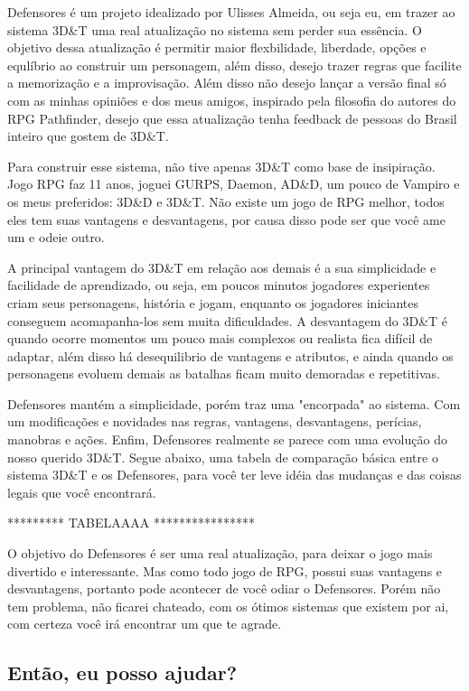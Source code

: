 Defensores é um projeto idealizado por Ulisses Almeida, ou seja eu, em trazer ao sistema 3D\&T uma real atualização no sistema sem perder sua essência. O objetivo dessa atualização é permitir maior flexbilidade, liberdade, opções e equlíbrio ao construir um personagem, além disso, desejo trazer regras que facilite a memorização e a improvisação. Além disso não desejo lançar a versão final só com as minhas opiniões e dos meus amigos, inspirado pela filosofia do autores do RPG Pathfinder, desejo que essa atualização tenha feedback de pessoas do Brasil inteiro que gostem de 3D\&T. 

Para construir esse sistema, não tive apenas 3D\&T como base de insipiração. Jogo RPG faz 11 anos, joguei GURPS, Daemon, AD\&D, um pouco de Vampiro e os meus preferidos: 3D\&D e 3D\&T. Não existe um jogo de RPG melhor, todos eles tem suas vantagens e desvantagens, por causa disso pode ser que você ame um e odeie outro. 

A principal vantagem do 3D\&T em relação aos demais é a sua simplicidade e facilidade de aprendizado, ou seja, em poucos minutos jogadores experientes criam seus personagens, história e jogam, enquanto os jogadores iniciantes conseguem acomapanha-los sem muita dificuldades. A desvantagem do 3D\&T é quando ocorre momentos um pouco mais complexos ou realista fica difícil de adaptar, além disso há desequilibrio de vantagens e atributos, e ainda quando os personagens evoluem demais as batalhas ficam muito demoradas e repetitivas.

Defensores mantém a simplicidade, porém traz uma "encorpada" ao sistema. Com um modificações e novidades nas regras, vantagens, desvantagens, perícias, manobras e ações. Enfim, Defensores realmente se parece com uma evolução do nosso querido 3D\&T. Segue abaixo, uma tabela de comparação básica entre o sistema 3D\&T e os Defensores, para você ter leve idéia das mudanças e das coisas legais que você encontrará.

********* TABELAAAA ****************

O objetivo do Defensores é ser uma real atualização, para deixar o jogo mais divertido e interessante. Mas como todo jogo de RPG, possui suas vantagens e desvantagens, portanto pode acontecer de você odiar o Defensores. Porém não tem problema, não ficarei chateado, com os ótimos sistemas que existem por ai, com certeza você irá encontrar um que te agrade. 

\subsection{Então, eu posso ajudar?}

